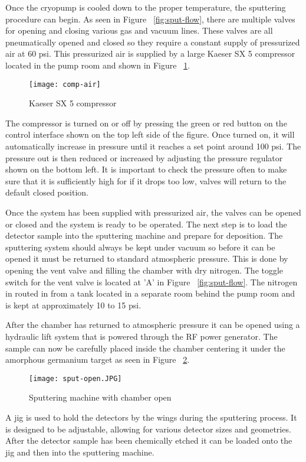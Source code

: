 Once the cryopump is cooled down to the proper temperature, the sputtering procedure can begin.
As seen in Figure ~\ref{fig:sput-flow}, there are multiple valves for opening and closing various gas and vacuum lines.
These valves are all pneumatically opened and closed so they require a constant supply of pressurized air at 60 psi.
This pressurized air is supplied by a large Kaeser SX 5 compressor located in the pump room and shown in Figure ~\ref{fig:comp-air}.
\begin{figure}[htpb]
\centering
\texttt{[image: comp-air]}
\caption{Kaeser SX 5 compressor}
\label{fig:comp-air}
\end{figure}
The compressor is turned on or off by pressing the green or red button on the control interface shown on the top left side of the figure.
Once turned on, it will automatically increase in pressure until it reaches a set point around 100 psi.
The pressure out is then reduced or increased by adjusting the pressure regulator shown on the bottom left.
It is important to check the pressure often to make sure that it is sufficiently high for if it drops too low, valves will return to the default closed position.

Once the system has been supplied with pressurized air, the valves can be opened or closed and the system is ready to be operated.
The next step is to load the detector sample into the sputtering machine and prepare for deposition.
The sputtering system should always be kept under vacuum so before it can be opened it must be returned to standard atmospheric pressure.
This is done by opening the vent valve and filling the chamber with dry nitrogen.
The toggle switch for the vent valve is located at 'A' in Figure ~\ref{fig:sput-flow}.
The nitrogen in routed in from a tank located in a separate room behind the pump room and is kept at approximately 10 to 15 psi.

After the chamber has returned to atmospheric pressure it can be opened using a hydraulic lift system that is powered through the RF power generator.
The sample can now be carefully placed inside the chamber centering it under the amorphous germanium target as seen in Figure ~\ref{fig:sput-open}.
\begin{figure}[htpb]
\centering
\texttt{[image: sput-open.JPG]}
\caption{Sputtering machine with chamber open}
\label{fig:sput-open}
\end{figure}
A jig is used to hold the detectors by the wings during the sputtering process.
It is designed to be adjustable, allowing for various detector sizes and geometries.
After the detector sample has been chemically etched it can be loaded onto the jig and then into the sputtering machine.

